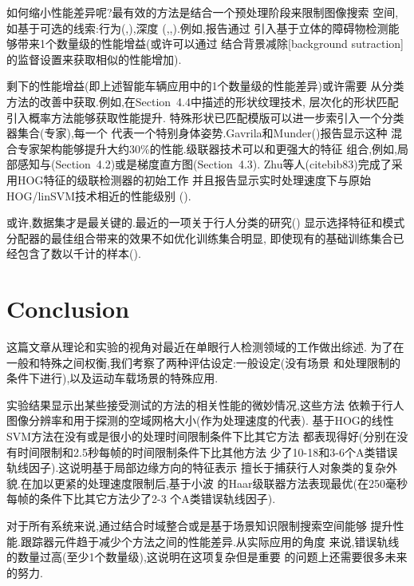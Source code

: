 \documentclass[10pt,letterpaper,journal,compsoc]{IEEEtran}
\begin{document}
如何缩小性能差异呢?最有效的方法是结合一个预处理阶段来限制图像搜索
空间,如基于可选的线索:行为(\cite{bib15},\cite{bib56}),深度
(\cite{bib7},\cite{bib23},\cite{bib81}).例如,\cite{bib23}报告通过
引入基于立体的障碍物检测能够带来1个数量级的性能增益(或许可以通过
结合背景减除[background sutraction]的监督设置来获取相似的性能增加).

剩下的性能增益(即上述智能车辆应用中的1个数量级的性能差异)或许需要
从分类方法的改善中获取.例如,在Section~4.4中描述的形状纹理技术,
层次化的形状匹配引入概率方法能够获取性能提升\cite{bib22}.
特殊形状已匹配模版可以进一步索引入一个分类器集合(专家),每一个
代表一个特别身体姿势.Gavrila和Munder(\cite{bib23})报告显示这种
混合专家架构能够提升大约30\%的性能.级联器技术可以和更强大的特征
组合,例如,局部感知与(Section~4.2)或是梯度直方图(Section~4.3).
Zhu等人(cite{bib83})完成了采用HOG特征的级联检测器的初始工作
并且报告显示实时处理速度下与原始HOG/linSVM技术相近的性能级别
(\cite{bib11}).

或许,数据集才是最关键的.最近的一项关于行人分类的研究(\cite{bib49})
显示选择特征和模式分配器的最佳组合带来的效果不如优化训练集合明显,
即使现有的基础训练集合已经包含了数以千计的样本(\cite{bib49}).
\section{Conclusion}
这篇文章从理论和实验的视角对最近在单眼行人检测领域的工作做出综述.
为了在一般和特殊之间权衡,我们考察了两种评估设定:一般设定(没有场景
和处理限制的条件下进行),以及运动车载场景的特殊应用.

实验结果显示出某些接受测试的方法的相关性能的微妙情况,这些方法
依赖于行人图像分辨率和用于探测的空域网格大小(作为处理速度的代表).
基于HOG的线性SVM方法在没有或是很小的处理时间限制条件下比其它方法
都表现得好(分别在没有时间限制和2.5秒每帧的时间限制条件下比其他方法
少了10-18和3-6个A类错误轨线因子).这说明基于局部边缘方向的特征表示
擅长于捕获行人对象类的复杂外貌.在加以更紧的处理速度限制后,基于小波
的Haar级联器方法表现最优(在250毫秒每帧的条件下比其它方法少了2-3
个A类错误轨线因子).

对于所有系统来说,通过结合时域整合或是基于场景知识限制搜索空间能够
提升性能.跟踪器元件趋于减少个方法之间的性能差异.从实际应用的角度
来说,错误轨线的数量过高(至少1个数量级),这说明在这项复杂但是重要
的问题上还需要很多未来的努力.
\end{document}

